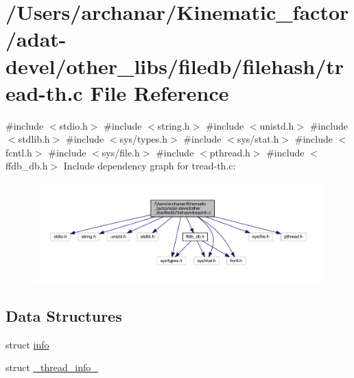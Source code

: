 \hypertarget{adat-devel_2other__libs_2filedb_2filehash_2tread-th_8c}{}\section{/\+Users/archanar/\+Kinematic\+\_\+factor/adat-\/devel/other\+\_\+libs/filedb/filehash/tread-\/th.c File Reference}
\label{adat-devel_2other__libs_2filedb_2filehash_2tread-th_8c}
{\ttfamily \#include $<$stdio.\+h$>$}\newline
{\ttfamily \#include $<$string.\+h$>$}\newline
{\ttfamily \#include $<$unistd.\+h$>$}\newline
{\ttfamily \#include $<$stdlib.\+h$>$}\newline
{\ttfamily \#include $<$sys/types.\+h$>$}\newline
{\ttfamily \#include $<$sys/stat.\+h$>$}\newline
{\ttfamily \#include $<$fcntl.\+h$>$}\newline
{\ttfamily \#include $<$sys/file.\+h$>$}\newline
{\ttfamily \#include $<$pthread.\+h$>$}\newline
{\ttfamily \#include $<$ffdb\+\_\+db.\+h$>$}\newline
Include dependency graph for tread-\/th.c\+:
\nopagebreak
\begin{figure}[H]
\begin{center}
\leavevmode
\includegraphics[width=350pt]{d1/d50/adat-devel_2other__libs_2filedb_2filehash_2tread-th_8c__incl}
\end{center}
\end{figure}
\subsection*{Data Structures}
\begin{DoxyCompactItemize}
\item 
struct \mbox{\hyperlink{structinfo}{info}}
\item 
struct \mbox{\hyperlink{struct__thread__info__}{\+\_\+thread\+\_\+info\+\_\+}}
\end{DoxyCompactItemize}
